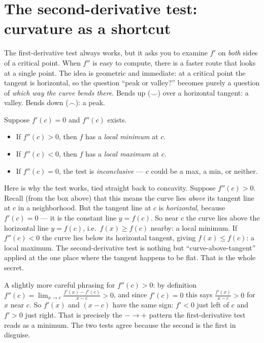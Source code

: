 \section{The second-derivative test: curvature as a shortcut}

The first-derivative test always works, but it asks you to examine $f'$ on
\emph{both} sides of a critical point. When $f''$ is easy to compute, there is a
faster route that looks at a single point. The idea is geometric and immediate:
at a critical point the tangent is horizontal, so the question ``peak or valley?''
becomes purely a question of \emph{which way the curve bends there}. Bends up
($\smile$) over a horizontal tangent: a valley. Bends down ($\frown$): a peak.

\begin{theorem}\label{ch16:thm-sdt}
Suppose $f'(c)=0$ and $f''(c)$ exists.
\begin{itemize}
\item If $f''(c)>0$, then $f$ has a \emph{local minimum} at $c$.
\item If $f''(c)<0$, then $f$ has a \emph{local maximum} at $c$.
\item If $f''(c)=0$, the test is \emph{inconclusive} --- $c$ could be a max, a min,
or neither.
\end{itemize}
\end{theorem}

\begin{whybox}
Here is why the test works, tied straight back to concavity. Suppose
$f''(c)>0$. Recall (from the box above) that this means the curve lies \emph{above}
its tangent line at $c$ in a neighborhood. But the tangent line at $c$ is
\emph{horizontal}, because $f'(c)=0$ --- it is the constant line $y=f(c)$. So near
$c$ the curve lies above the horizontal line $y=f(c)$, i.e.\ $f(x)\ge f(c)$ nearby:
a local minimum. If $f''(c)<0$ the curve lies below its horizontal tangent, giving
$f(x)\le f(c)$: a local maximum. The second-derivative test is nothing but
``curve-above-tangent'' applied at the one place where the tangent happens to be
flat. That is the whole secret.

A slightly more careful phrasing for $f''(c)>0$: by definition
$f''(c)=\lim_{x\to c}\frac{f'(x)-f'(c)}{x-c}>0$, and since $f'(c)=0$ this says
$\frac{f'(x)}{x-c}>0$ for $x$ near $c$. So $f'(x)$ and $(x-c)$ have the same sign:
$f'<0$ just left of $c$ and $f'>0$ just right. That is precisely the $-\to+$
pattern the first-derivative test reads as a minimum. The two tests agree because
the second is the first in disguise.
\end{whybox}

